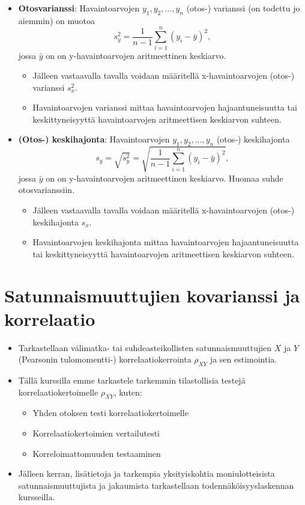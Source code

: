 \documentclass[
]{book}
\providecommand{\tightlist}{%
  \setlength{\itemsep}{0pt}\setlength{\parskip}{0pt}}
\begin{document}
\hfill\break

\begin{itemize}
\tightlist
\item
  \textbf{Otosvarianssi}: Havaintoarvojen \(y_1, y_2,\ldots, y_n\) (otos-) varianssi (on todettu jo aiemmin) on muotoa
  \[
    s^2_y = \frac{1}{n-1} \sum_{i=1}^{n} (y_i - \bar{y})^2,
  \]
  jossa \(\bar{y}\) on on y-havaintoarvojen aritmeettinen keskiarvo.

  \begin{itemize}
  \tightlist
  \item
    Jälleen vastaavalla tavalla voidaan määritellä x-havaintoarvojen (otos-) varianssi \(s^2_x\).
  \item
    Havaintoarvojen varianssi mittaa havaintoarvojen hajaantuneisuutta tai keskittyneisyyttä havaintoarvojen aritmeettisen keskiarvon suhteen.
  \end{itemize}
\item
  \textbf{(Otos-) keskihajonta}: Havaintoarvojen \(y_1, y_2,\ldots, y_n\) (otos-) keskihajonta
  \[
    s_y = \sqrt{s^2_y} = \sqrt{\frac{1}{n-1} \sum_{i=1}^{n} (y_i - \bar{y})^2},
  \]
  jossa \(\bar{y}\) on on y-havaintoarvojen aritmeettinen keskiarvo. Huomaa suhde otosvarianssiin.

  \begin{itemize}
  \tightlist
  \item
    Jälleen vastaavalla tavalla voidaan määritellä x-havaintoarvojen (otos-) keskihajonta \(s_x\).
  \item
    Havaintoarvojen keskihajonta mittaa havaintoarvojen hajaantuneisuutta tai keskittyneisyyttä havaintoarvojen aritmeettisen keskiarvon suhteen.
  \end{itemize}
\end{itemize}

\hfill\break

\hypertarget{alaluku64}{%
\section{Satunnaismuuttujien kovarianssi ja korrelaatio}\label{alaluku64}}

\begin{itemize}
\item
  Tarkastellaan välimatka- tai suhdeasteikollisten satunnaismuuttujien \(X\) ja \(Y\) (Pearsonin tulomomentti-) korrelaatiokerrointa \(\rho_{XY}\) ja sen estimointia.
\item
  Tällä kurssilla emme tarkastele tarkemmin tilastollisia testejä korrelaatiokertoimelle \(\rho_{XY}\), kuten:

  \begin{itemize}
  \tightlist
  \item
    Yhden otoksen testi korrelaatiokertoimelle
  \item
    Korrelaatiokertoimien vertailutesti
  \item
    Korreloimattomuuden testaaminen
  \end{itemize}
\item
  Jälleen kerran, lisätietoja ja tarkempia yksityiskohtia moniulotteisista satunnaismuuttujista ja jakaumista tarkastellaan todennäköisyyslaskennan kursseilla.
\end{itemize}
\end{document}
